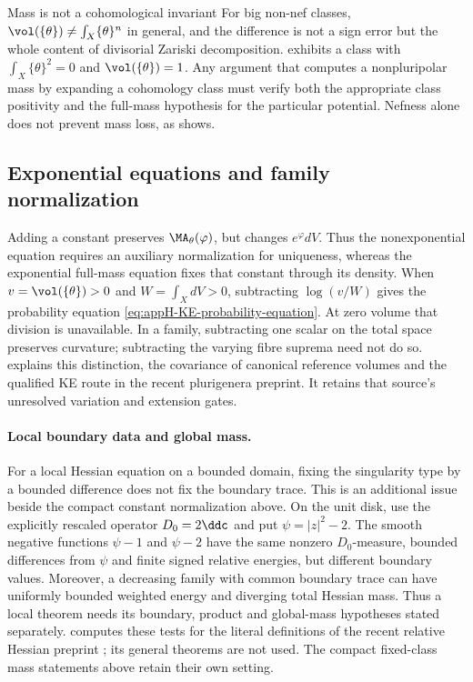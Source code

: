 \begin{warning}{Mass is not a cohomological invariant}
\label{warn:ch51-mass-not-cohomological}
For big non-nef classes, $\vol(\{\theta\})\neq\int_X\{\theta\}^n$ in
general, and the difference is not a sign error but the whole content of
divisorial Zariski decomposition.   exhibits a
class with $\int_X\{\theta\}^2=0$ and $\vol(\{\theta\})=1$.  Any
argument that computes a nonpluripolar mass by expanding a cohomology
class must verify both the appropriate class positivity and the
full-mass hypothesis for the particular potential.  Nefness alone does
not prevent mass loss, as  shows.
\end{warning}

\subsection{Exponential equations and family normalization}
\label{sec:ch51-KE-family-normalization}

Adding a constant preserves $\MA_\theta(\varphi)$, but changes
$e^\varphi dV$. Thus the nonexponential equation requires an
auxiliary normalization for uniqueness, whereas the exponential
full-mass equation fixes that constant through its density. When
$v=\vol(\{\theta\})>0$ and $W=\int_XdV>0$, subtracting
$\log(v/W)$ gives the probability equation
\eqref{eq:appH-KE-probability-equation}. At zero volume that division
is unavailable. In a family, subtracting one scalar on the total
space preserves curvature; subtracting the varying fibre suprema
need not do so.  explains
this distinction, the covariance of canonical reference volumes
and the qualified KE route in the recent plurigenera preprint.
It retains that source's unresolved variation and extension gates.


\paragraph{Local boundary data and global mass.}
For a local Hessian equation on a bounded domain, fixing the singularity
type by a bounded difference does not fix the boundary trace. This is an
additional issue beside the compact constant normalization above.
On the unit disk, use the explicitly rescaled operator
$D_0=2\ddc$ and put $\psi=|z|^2-2$. The smooth negative functions
$\psi-1$ and $\psi-2$ have the same nonzero $D_0$-measure, bounded
differences from $\psi$ and finite signed relative energies, but different
boundary values. Moreover, a decreasing family with common boundary trace
can have uniformly bounded weighted energy and diverging total Hessian mass.
Thus a local theorem needs its boundary, product and global-mass hypotheses
stated separately.  computes these
tests for the literal definitions of the recent relative Hessian preprint
\cite{Truong26RelativeHessianV1}; its general theorems are not used.
The compact fixed-class mass statements above retain their own setting.

